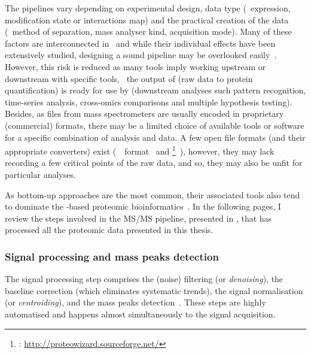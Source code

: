 The pipelines vary depending on experimental design, data type
(\ie\ expression, modification state or interactions map)
and the practical creation of the data (\eg\ method of separation,
mass analyser kind, acquisition mode).
Many of these factors are interconnected in \ms\
and while their individual effects have been extensively studied,
designing a sound pipeline may be overlooked easily~.
However,
this risk is reduced as
many tools imply working upstream or downstream with specific tools,
\eg\ the output of \soft{MaxQuant} (raw data to protein quantification) is
ready for use by 
(downstream analyses such pattern recognition,
time-series analysis, cross-omics comparisons and multiple hypothesis testing).
Besides, as files from mass spectrometers are usually encoded
in proprietary (commercial) formats,
there may be a limited choice of available tools or software
for a specific combination of analysis and data.
A few open file formats (and their appropriate converters) exist
(\eg\ \mzml\ format~\mycite{mzML}
and \href{http://proteowizard.sourceforge.net/}{}\footnote{%
\soft{ProteoWizard}: \href{http://proteowizard.sourceforge.net/}%
{http://proteowizard.sourceforge.net/}}~\mycite{proteowizard2012}),
however, they may lack recording a few critical points of the raw data,
and so, they may also be unfit for particular analyses.\mybr\

As bottom-up approaches are the most common,
their associated tools also tend to dominate
the \ms{}-based proteomic bioinformatics~.
In the following pages,
I review the steps involved in the \gls{MS/MS} pipeline,
presented in ,
that has processed all the proteomic data presented in this thesis.\mybr\

\subsubsection{Signal processing and mass peaks detection}

The signal processing step comprises
the (noise) filtering (or \emph{denoising}),
the baseline correction (which eliminates systematic trends),
the signal normalisation (or \emph{centroiding}),
and the mass peaks detection~.
These steps are highly automatised and
happens almost simultaneously to the signal acquisition.\mybr\

